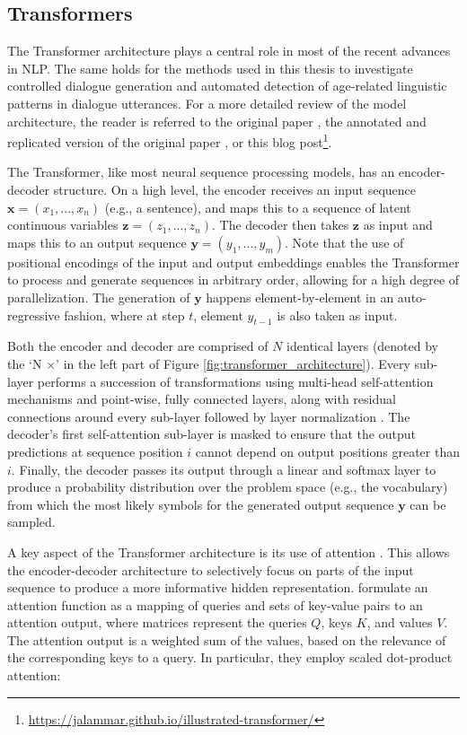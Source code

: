\subsection{Transformers}

The Transformer architecture plays a central role in most of the recent advances in NLP. The same holds for the methods used in this thesis to investigate controlled dialogue generation and automated detection of age-related linguistic patterns in dialogue utterances. For a more detailed review of the model architecture, the reader is referred to the original paper \citep{vaswani2017attention}, the annotated and replicated version of the original paper \citep{rush-2018-annotated}, or this blog post\footnote{\url{https://jalammar.github.io/illustrated-transformer/}}.

The Transformer, like most neural sequence processing models, has an encoder-decoder structure. On a high level, the encoder receives an input sequence $\textbf{x} = (x_1, ..., x_n)$ (e.g., a sentence), and maps this to a sequence of latent continuous variables $\textbf{z} = (z_1, ..., z_n)$. The decoder then takes $\textbf{z}$ as input and maps this to an output sequence $\textbf{y} = (y_1, ..., y_m)$. Note that the use of positional encodings of the input and output embeddings enables the Transformer to process and generate sequences in arbitrary order, allowing for a high degree of parallelization. The generation of $\textbf{y}$ happens element-by-element in an auto-regressive fashion, where at step $t$, element $y_{t - 1}$ is also taken as input.

Both the encoder and decoder are comprised of $N$ identical layers (denoted by the `N $\times$' in the left part of Figure \ref{fig:transformer_architecture}). Every sub-layer performs a succession of transformations using multi-head self-attention mechanisms and point-wise, fully connected layers, along with residual connections \citep{he2016residual} around every sub-layer followed by layer normalization \citep{DBLP:journals/corr/BaKH16}. The decoder's first self-attention sub-layer is masked to ensure that the output predictions at sequence position $i$ cannot depend on output positions greater than $i$. Finally, the decoder passes its output through a linear and softmax layer to produce a probability distribution over the problem space (e.g., the vocabulary) from which the most likely symbols for the generated output sequence $\textbf{y}$ can be sampled.

A key aspect of the Transformer architecture is its use of attention \citep{DBLP:journals/corr/BahdanauCB14}. This allows the encoder-decoder architecture to selectively focus on parts of the input sequence to produce a more informative hidden representation. \cite{vaswani2017attention} formulate an attention function as a mapping of queries and sets of key-value pairs to an attention output, where matrices represent the queries $Q$, keys $K$, and values $V$. The attention output is a weighted sum of the values, based on the relevance of the corresponding keys to a query. In particular, they employ scaled dot-product attention:

